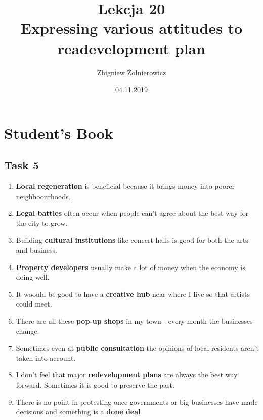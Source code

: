 \documentclass[a4paper]{article}
\begin{document}
\title{{\huge Lekcja 20} \\
{\large Expressing various attitudes to readevelopment plan}}
\author{Zbigniew Żołnierowicz}
\date{04.11.2019}
\maketitle
\section{Student's Book}
\subsection{Task 5}
\begin{enumerate}
    \item {\bf Local regeneration} is beneficial because it brings money into poorer neighboourhoods.
    \item {\bf Legal battles} often occur when people can't agree about the best way for the city to grow.
    \item Building {\bf cultural institutions} like concert halls is good for both the arts and business.
    \item {\bf Property developers} usually make a lot of money when the economy is doing well.
    \item It woould be good to have a {\bf creative hub} near where I live so that artists could meet.
    \item There are all these {\bf pop-up shops} in my town - every month the businesses change.
    \item Sometimes even at {\bf public consultation} the opinions of local residents aren't taken into account.
    \item I don't feel that major {\bf redevelopment plans} are always the best way forward. Sometimes it is good to preserve the past.
    \item There is no point in protesting once governments or big businesses have made decisions and something is a {\bf done deal}
\end{enumerate}
\end{document}
